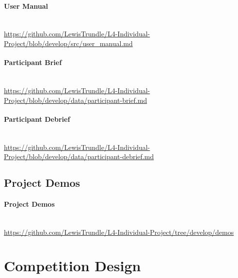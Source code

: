 \documentclass{l4proj}
\begin{document}
\begin{appendices}
\subsubsection{User Manual} \hfill \\
\url{https://github.com/LewisTrundle/L4-Individual-Project/blob/develop/src/user\_manual.md}
\\
\subsubsection{Participant Brief} \hfill \\
\url{https://github.com/LewisTrundle/L4-Individual-Project/blob/develop/data/participant-brief.md}
\\
\subsubsection{Participant Debrief} \hfill \\
\url{https://github.com/LewisTrundle/L4-Individual-Project/blob/develop/data/participant-debrief.md}

\section{Project Demos}
\subsubsection{Project Demos} \hfill \\
\url{https://github.com/LewisTrundle/L4-Individual-Project/tree/develop/demos}



\chapter{Competition Design}\label{app:comp-design}


\end{appendices}
\end{document}
